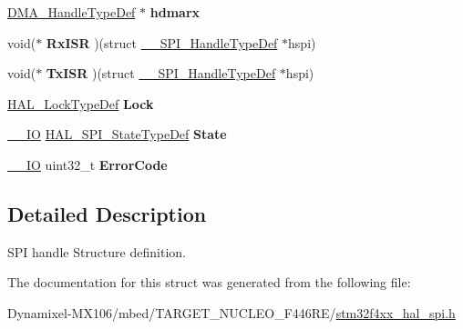 \begin{DoxyCompactItemize}
\item 
\hyperlink{group___d_m_a___exported___types_ga41b754a906b86bce54dc79938970138b}{D\+M\+A\+\_\+\+Handle\+Type\+Def} $\ast$ {\bfseries hdmarx}\hypertarget{struct_____s_p_i___handle_type_def_a0876a1b344524bbdbd984be1c3b07a10}{}\label{struct_____s_p_i___handle_type_def_a0876a1b344524bbdbd984be1c3b07a10}

\item 
void($\ast$ {\bfseries Rx\+I\+SR} )(struct \hyperlink{struct_____s_p_i___handle_type_def}{\+\_\+\+\_\+\+S\+P\+I\+\_\+\+Handle\+Type\+Def} $\ast$hspi)\hypertarget{struct_____s_p_i___handle_type_def_a599045b20d284f94e5a367a85cad9f39}{}\label{struct_____s_p_i___handle_type_def_a599045b20d284f94e5a367a85cad9f39}

\item 
void($\ast$ {\bfseries Tx\+I\+SR} )(struct \hyperlink{struct_____s_p_i___handle_type_def}{\+\_\+\+\_\+\+S\+P\+I\+\_\+\+Handle\+Type\+Def} $\ast$hspi)\hypertarget{struct_____s_p_i___handle_type_def_a4446bdc11698f861edf37b72cf437aeb}{}\label{struct_____s_p_i___handle_type_def_a4446bdc11698f861edf37b72cf437aeb}

\item 
\hyperlink{stm32f4xx__hal__def_8h_ab367482e943333a1299294eadaad284b}{H\+A\+L\+\_\+\+Lock\+Type\+Def} {\bfseries Lock}\hypertarget{struct_____s_p_i___handle_type_def_aa13d993a0b9b0ea6a07e5a77eeaf394e}{}\label{struct_____s_p_i___handle_type_def_aa13d993a0b9b0ea6a07e5a77eeaf394e}

\item 
\hyperlink{core__sc300_8h_aec43007d9998a0a0e01faede4133d6be}{\+\_\+\+\_\+\+IO} \hyperlink{group___s_p_i___exported___types_ga8891cb64e76198a860172d94c638c9b4}{H\+A\+L\+\_\+\+S\+P\+I\+\_\+\+State\+Type\+Def} {\bfseries State}\hypertarget{struct_____s_p_i___handle_type_def_aa3e13040cc9ea19050d21818bccd49c9}{}\label{struct_____s_p_i___handle_type_def_aa3e13040cc9ea19050d21818bccd49c9}

\item 
\hyperlink{core__sc300_8h_aec43007d9998a0a0e01faede4133d6be}{\+\_\+\+\_\+\+IO} uint32\+\_\+t {\bfseries Error\+Code}\hypertarget{struct_____s_p_i___handle_type_def_ab2497f2e3cfae59376db75da3bda7ffe}{}\label{struct_____s_p_i___handle_type_def_ab2497f2e3cfae59376db75da3bda7ffe}

\end{DoxyCompactItemize}


\subsection{Detailed Description}
S\+PI handle Structure definition. 

The documentation for this struct was generated from the following file\+:\begin{DoxyCompactItemize}
\item 
Dynamixel-\/\+M\+X106/mbed/\+T\+A\+R\+G\+E\+T\+\_\+\+N\+U\+C\+L\+E\+O\+\_\+\+F446\+R\+E/\hyperlink{stm32f4xx__hal__spi_8h}{stm32f4xx\+\_\+hal\+\_\+spi.\+h}\end{DoxyCompactItemize}

